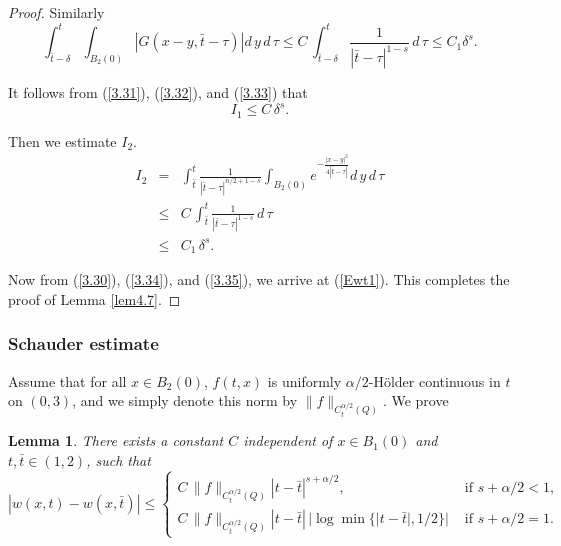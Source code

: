 \documentclass[12pt]{article}
\newtheorem{lemma}[definition]{Lemma}
\theoremstyle{remark}
\numberwithin{equation}{section}
\begin{document}
\begin{proof}
Similarly
\begin{equation}
\int_{\bar{t}-\delta}^t \int_{B_2(0)} | G(x-y, \bar{t}-\tau) | d \, y \, d \, \tau \leq  C \, \int_{\bar{t}-\delta}^t  \frac{1}{|\bar{t} -\tau|^{1-s}} \, d \, \tau \leq C_1 \delta^s.
\label{3.33}
\end{equation}

It follows from (\ref{3.31}), (\ref{3.32}), and (\ref{3.33}) that
\begin{equation}
I_1 \leq C \, \delta^s.
\label{3.34}
\end{equation}

Then we estimate $I_2$.
\begin{eqnarray}
I_2 &=& \int_{\bar{t}}^t  \frac{1}{|\bar{t} -\tau|^{n/2 +1-s}}\int_{B_2(0)} e^{-\frac{|x-y|^2}{4|\bar{t}-\tau|}} d \, y \, d \, \tau \nonumber \\
& \leq & C \,  \int_{\bar{t}}^t  \frac{1}{|\bar{t} -\tau|^{1-s}} \, d \, \tau \nonumber \\
& \leq & C_1 \, \delta^s.
\label{3.35}
\end{eqnarray}

Now from (\ref{3.30}), (\ref{3.34}), and (\ref{3.35}), we arrive at (\ref{Ewt1}). This completes the proof of Lemma \ref{lem4.7}.
\end{proof}

\subsubsection{Schauder estimate}

Assume that for all $x \in B_2(0)$, $f(t,x)$ is uniformly $\alpha/2$-H\"{o}lder continuous in $t$ on $(0,3)$, and we simply denote this norm by $\|f\|_{C_t^{\alpha/2}(Q)}$.
We prove
\begin{lemma} \label{lem4.9}
There exists a constant $C$ independent of  $x \in B_1(0)$ and $t, \bar{t} \in (1,2)$, such that
\begin{equation}
|w(x, t) - w(x, \bar{t})| \leq \left\{\begin{array}{ll} C \, \|f\|_{C_t^{\alpha/2}(Q)} |t-\bar{t}|^{s+\alpha/2}, & \mbox{ if } s + \alpha/2 <1, \\
C \, \|f\|_{C_t^{\alpha/2}(Q)} |t-\bar{t}| \, |\log \min\{|t-\bar{t}|, 1/2\}| & \mbox{ if } s + \alpha/2 =1.
\end{array}
\right.
\label{Ewt2}
\end{equation}
\end{lemma}
\end{document}
